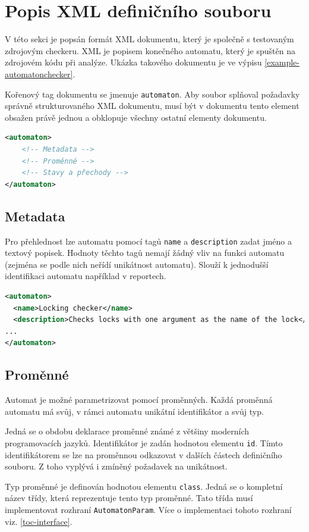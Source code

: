 \documentclass[11pt,final,oneside]{fithesis}
\begin{document}
\section{Popis XML definičního souboru}

V této sekci je popsán formát XML dokumentu, který je společně s testovaným zdrojovým checkeru. XML je popisem konečného automatu, který je spuštěn na zdrojovém kódu při analýze. Ukázka takového dokumentu je ve výpisu \ref{example-automatonchecker}.


Kořenový tag dokumentu se jmenuje {\tt automaton}. Aby soubor splňoval požadavky správně strukturovaného XML dokumentu, musí být v dokumentu tento element obsažen právě jednou a obklopuje všechny ostatní elementy dokumentu.

\begin{lstlisting}[language=XML]
<automaton>
	<!-- Metadata -->
	<!-- Proměnné -->
	<!-- Stavy a přechody -->
</automaton>
\end{lstlisting}


\subsection{Metadata}
Pro přehlednost lze automatu pomocí tagů {\tt name} a {\tt description} zadat jméno a textový popisek. Hodnoty těchto tagů nemají žádný vliv na funkci automatu (zejména se podle nich neřídí unikátnost automatu). Slouží k jednodušší identifikaci automatu například v reportech.

\begin{lstlisting}[language=XML]
<automaton>
  <name>Locking checker</name>
  <description>Checks locks with one argument as the name of the lock</description>
...
</automaton>
\end{lstlisting}

\subsection{Proměnné}\label{params}
Automat je možné parametrizovat pomocí proměnných. Každá proměnná automatu má svůj, v rámci automatu unikátní identifikátor a svůj typ.

Jedná se o obdobu deklarace proměnné známé z většiny moderních programovacích jazyků. Identifikátor je zadán hodnotou elementu {\tt id}. Tímto identifikátorem se lze na proměnnou odkazovat v dalších částech definičního souboru. Z toho vyplývá i zmíněný požadavek na unikátnost.

Typ proměnné je definován hodnotou elementu {\tt class}. Jedná se o kompletní název třídy, která reprezentuje tento typ proměnné. Tato třída musí implementovat rozhraní {\tt AutomatonParam}. Více o implementaci tohoto rozhraní viz. \ref{toc-interface}.
\end{document}
